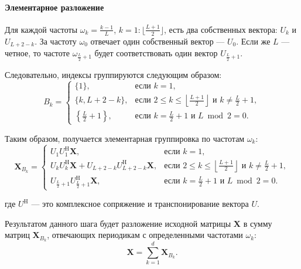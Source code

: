 \documentclass[12pt, specialist, subf
]{disser}
\theoremstyle{definition}
\begin{document}
\paragraph{Элементарное разложение \newline}

Для каждой частоты $\omega_k = \frac{k-1}{L}$, $k = 1:\lfloor \frac{L+1}{2} \rfloor$, есть два собственных вектора: $U_k$ и $U_{L+2-k}$. За частоту $\omega_0$ отвечает один собственный вектор --- $U_0$. Если же $L$ --- четное, то частоте $\omega_{\frac{L}{2} + 1}$ будет соответствовать один вектор $U_{\frac{L}{2}+1}$.

Следовательно, индексы группируются следующим образом:
\[
B_k = 
\begin{cases}
\{1\}, & \text{если } k = 1, \\
\{k, L + 2 - k\}, & \text{если } 2 \leq k \leq \left\lfloor \frac{L+1}{2} \right\rfloor \text{ и } k \ne \frac{L}{2} + 1, \\
\left\{ \frac{L}{2} + 1 \right\}, & \text{если } k = \frac{L}{2} + 1 \text{ и } L \bmod 2 = 0.
\end{cases}
\]


Таким образом, получается элементарная группировка по частотам $\omega_k$:
\[
\mathbf{X}_{B_k} = 
\begin{cases}
U_1 U_1^\mathrm{H} \mathbf{X}, & \text{если } k = 1, \\[5pt]
U_k U_k^\mathrm{H} \mathbf{X} + U_{L+2-k} U_{L+2-k}^\mathrm{H} \mathbf{X}, & \text{если } 2 \leq k \leq \left\lfloor \frac{L+1}{2} \right\rfloor \text{ и } k \ne \frac{L}{2} + 1, \\[5pt]
U_{\frac{L}{2} + 1} U_{\frac{L}{2} + 1}^\mathrm{H} \mathbf{X}, & \text{если } k = \frac{L}{2} + 1 \text{ и } L \bmod 2 = 0.
\end{cases}
\]

где $U^\mathrm{H}$ --- это комплексное сопряжение и транспонирование вектора $U$.

Результатом данного шага будет разложение исходной матрицы $\mathbf X$ в сумму матриц $\mathbf{X}_{B_k}$, отвечающих периодикам с определенными частотами $\omega_k$:
\begin{equation*}
	\mathbf X = \sum\limits_{k=1}^d \mathbf{X}_{B_k} .
\end{equation*}
\end{document}
